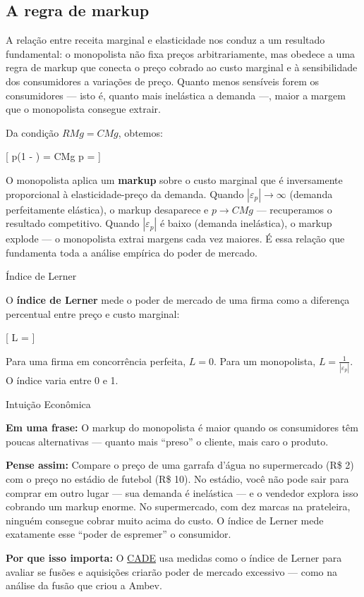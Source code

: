 \documentclass[11pt,twoside,openright]{book}
\begin{document}
\subsection{A regra de markup}\label{a-regra-de-markup}

A relação entre receita marginal e elasticidade nos conduz a um
resultado fundamental: o monopolista não fixa preços arbitrariamente,
mas obedece a uma regra de markup que conecta o preço cobrado ao custo
marginal e à sensibilidade dos consumidores a variações de preço. Quanto
menos sensíveis forem os consumidores --- isto é, quanto mais inelástica
a demanda ---, maior a margem que o monopolista consegue extrair.

Da condição \(RMg = CMg\), obtemos:

{[} p\left(1 - \right) = CMg \implies p =
 \label{eq:15.5}  {]}

O monopolista aplica um \textbf{markup} sobre o custo marginal que é
inversamente proporcional à elasticidade-preço da demanda. Quando
\(|\varepsilon_p| \to \infty\) (demanda perfeitamente elástica), o
markup desaparece e \(p \to CMg\) --- recuperamos o resultado
competitivo. Quando \(|\varepsilon_p|\) é baixo (demanda inelástica), o
markup explode --- o monopolista extrai margens cada vez maiores. É essa
relação que fundamenta toda a análise empírica do poder de mercado.

\begin{definitionbox}{Índice de Lerner}

O \textbf{índice de Lerner} mede o poder de mercado de uma firma como a
diferença percentual entre preço e custo marginal:

{[} L =  \label{eq:15.6}  {]}

Para uma firma em concorrência perfeita, \(L = 0\). Para um monopolista,
\(L = \frac{1}{|\varepsilon_p|}\). O índice varia entre 0 e 1.

\end{definitionbox}

\begin{intuitionbox}{Intuição Econômica}

\textbf{Em uma frase:} O markup do monopolista é maior quando os
consumidores têm poucas alternativas --- quanto mais ``preso'' o
cliente, mais caro o produto.

\textbf{Pense assim:} Compare o preço de uma garrafa d'água no
supermercado (R\$ 2) com o preço no estádio de futebol (R\$ 10). No
estádio, você não pode sair para comprar em outro lugar --- sua demanda
é inelástica --- e o vendedor explora isso cobrando um markup enorme. No
supermercado, com dez marcas na prateleira, ninguém consegue cobrar
muito acima do custo. O índice de Lerner mede exatamente esse ``poder de
espremer'' o consumidor.

\textbf{Por que isso importa:} O \href{https://www.gov.br/cade}{CADE}
usa medidas como o índice de Lerner para avaliar se fusões e aquisições
criarão poder de mercado excessivo --- como na análise da fusão que
criou a Ambev.

\end{intuitionbox}
\end{document}
